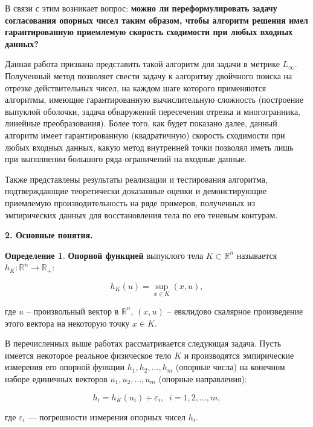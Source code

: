 \documentclass[a4paper, 10pt]{article}
\theoremstyle{definition}
\newtheorem{SmartDefinition}{Определение}
\theoremstyle{plain}
\theoremstyle{plain}
\begin{document}
В связи с этим возникает вопрос: \textbf{можно ли переформулировать задачу
согласования опорных чисел таким образом, чтобы алгоритм решения имел
гарантированную приемлемую скорость сходимости при любых входных данных?}

Данная работа призвана представить такой алгоритм для задачи в метрике
$L_\infty$. Полученный метод позволяет свести задачу к алгоритму двойчного
поиска на отрезке действительных чисел, на каждом шаге которого применяются
алгоритмы, имеющие гарантированную вычислительную сложность (построение
выпуклой оболочки, задача обнаружений пересечения отрезка и многогранника,
линейные преобразования).
Более того, как будет показано далее, данный алгоритм имеет
гарантированную (квадратичную) скорость сходимости при любых входных данных,
какую метод внутренней точки позволял иметь лишь при выполнении большого ряда
ограничений на входные данные.

Также представлены результаты реализации и тестирования алгоритма,
подтверждающие теоретически доказанные оценки и демонстирующие приемлемую
производительность на ряде примеров, полученных из эмпирических данных
для восстановления тела по его теневым контурам.

\textbf{2. Основные понятия.}
\begin{SmartDefinition}
 \label{def:support-function}
 \textbf{Опорной функцией} выпуклого тела $K \subset \mathbb{R}^{n}$
 называется
 $h_{K}: \mathbb{R}^{n} \to \mathbb{R}_{+}$:

 \begin{equation*}h_{K}(u) = \sup \limits_{x \in K}(x, u),\end{equation*}
\end{SmartDefinition}
где $u$ -- произвольный вектор в $\mathbb{R}^n$,
$(x, u)$ -- евклидово скалярное произведение этого вектора на некоторую точку
$x \in K$.

В перечисленных выше работах рассматривается следующая задача. Пусть
имеется некоторое реальное физическое тело $K$ и производятся эмпирические
измерения его опорной функции $h_{1}, h_{2}, \ldots, h_{m}$ (опорные числа) на
конечном наборе единичных векторов $u_{1}, u_{2}, \ldots, u_{m}$
(опорные направления):

\begin{equation*}
 h_{i} = h_{K}(u_{i}) + \varepsilon_{i}, \;\; i = 1, 2, \ldots, m,
\end{equation*}

где $\varepsilon_{i}$ --- погрешности измерения опорных чисел $h_{i}$.
\end{document}
